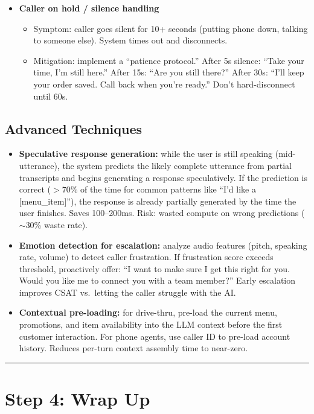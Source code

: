 \begin{itemize}
  \item \textbf{Caller on hold / silence handling}
  \begin{itemize}
    \item Symptom: caller goes silent for 10+ seconds (putting phone down, talking to someone else). System times out and disconnects.
    \item Mitigation: implement a ``patience protocol.'' After 5s silence: ``Take your time, I'm still here.'' After 15s: ``Are you still there?'' After 30s: ``I'll keep your order saved. Call back when you're ready.'' Don't hard-disconnect until 60s.
  \end{itemize}
\end{itemize}

\subsection*{Advanced Techniques}
\begin{itemize}
  \item \textbf{Speculative response generation:} while the user is still speaking (mid-utterance), the system predicts the likely complete utterance from partial transcripts and begins generating a response speculatively. If the prediction is correct ($>$70\% of the time for common patterns like ``I'd like a [menu\_item]''), the response is already partially generated by the time the user finishes. Saves 100--200ms. Risk: wasted compute on wrong predictions ($\sim$30\% waste rate).
  \item \textbf{Emotion detection for escalation:} analyze audio features (pitch, speaking rate, volume) to detect caller frustration. If frustration score exceeds threshold, proactively offer: ``I want to make sure I get this right for you. Would you like me to connect you with a team member?'' Early escalation improves CSAT vs.\ letting the caller struggle with the AI.
  \item \textbf{Contextual pre-loading:} for drive-thru, pre-load the current menu, promotions, and item availability into the LLM context before the first customer interaction. For phone agents, use caller ID to pre-load account history. Reduces per-turn context assembly time to near-zero.
\end{itemize}

\bigskip\hrule\bigskip

\section*{Step 4: Wrap Up}

